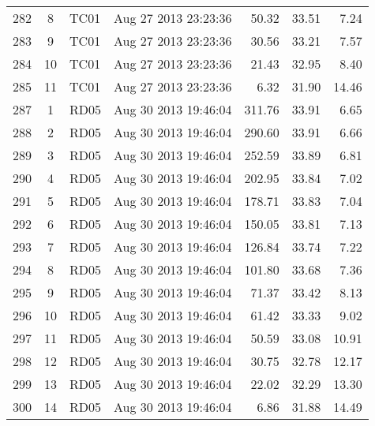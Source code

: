 \begin{longtable}{ccllrrr}
282&8&TC01&Aug 27 2013 23:23:36&50.32&33.51&7.24\\
283&9&TC01&Aug 27 2013 23:23:36&30.56&33.21&7.57\\
284&10&TC01&Aug 27 2013 23:23:36&21.43&32.95&8.40\\
285&11&TC01&Aug 27 2013 23:23:36&6.32&31.90&14.46\\
\hline 
287&1&RD05&Aug 30 2013 19:46:04&311.76&33.91&6.65\\
288&2&RD05&Aug 30 2013 19:46:04&290.60&33.91&6.66\\
289&3&RD05&Aug 30 2013 19:46:04&252.59&33.89&6.81\\
290&4&RD05&Aug 30 2013 19:46:04&202.95&33.84&7.02\\
291&5&RD05&Aug 30 2013 19:46:04&178.71&33.83&7.04\\
292&6&RD05&Aug 30 2013 19:46:04&150.05&33.81&7.13\\
293&7&RD05&Aug 30 2013 19:46:04&126.84&33.74&7.22\\
294&8&RD05&Aug 30 2013 19:46:04&101.80&33.68&7.36\\
295&9&RD05&Aug 30 2013 19:46:04&71.37&33.42&8.13\\
296&10&RD05&Aug 30 2013 19:46:04&61.42&33.33&9.02\\
297&11&RD05&Aug 30 2013 19:46:04&50.59&33.08&10.91\\
298&12&RD05&Aug 30 2013 19:46:04&30.75&32.78&12.17\\
299&13&RD05&Aug 30 2013 19:46:04&22.02&32.29&13.30\\
300&14&RD05&Aug 30 2013 19:46:04&6.86&31.88&14.49\\
\hline 

 \end{longtable} 
